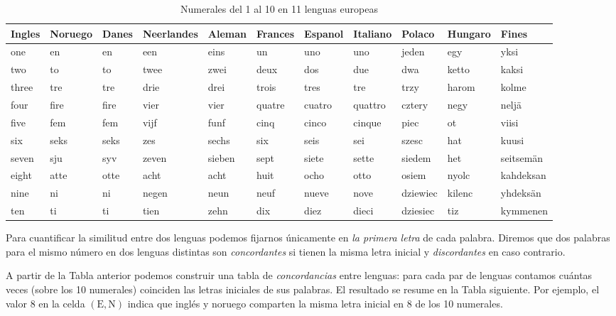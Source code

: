 \documentclass[
]{book}
\begin{document}
\begin{table}

\caption{\label{tab:ac20}Numerales del 1 al 10 en 11 lenguas europeas}
\centering
\begin{tabular}[t]{l|l|l|l|l|l|l|l|l|l|l}
\hline
Ingles & Noruego & Danes & Neerlandes & Aleman & Frances & Espanol & Italiano & Polaco & Hungaro & Fines\\
\hline
one & en & en & een & eins & un & uno & uno & jeden & egy & yksi\\
\hline
two & to & to & twee & zwei & deux & dos & due & dwa & ketto & kaksi\\
\hline
three & tre & tre & drie & drei & trois & tres & tre & trzy & harom & kolme\\
\hline
four & fire & fire & vier & vier & quatre & cuatro & quattro & cztery & negy & neljä\\
\hline
five & fem & fem & vijf & funf & cinq & cinco & cinque & piec & ot & viisi\\
\hline
six & seks & seks & zes & sechs & six & seis & sei & szesc & hat & kuusi\\
\hline
seven & sju & syv & zeven & sieben & sept & siete & sette & siedem & het & seitsemän\\
\hline
eight & atte & otte & acht & acht & huit & ocho & otto & osiem & nyolc & kahdeksan\\
\hline
nine & ni & ni & negen & neun & neuf & nueve & nove & dziewiec & kilenc & yhdeksän\\
\hline
ten & ti & ti & tien & zehn & dix & diez & dieci & dziesiec & tiz & kymmenen\\
\hline
\end{tabular}
\end{table}

Para cuantificar la similitud entre dos lenguas podemos fijarnos únicamente en \emph{la primera letra} de cada palabra.
Diremos que dos palabras para el mismo número en dos lenguas distintas son \emph{concordantes} si tienen la misma letra inicial y \emph{discordantes} en caso contrario.

A partir de la Tabla anterior podemos construir una tabla de \emph{concordancias} entre lenguas: para cada par de lenguas contamos cuántas veces (sobre los 10 numerales) coinciden las letras iniciales de sus palabras.
El resultado se resume en la Tabla siguiente. Por ejemplo, el valor 8 en la celda \((\text{E},\text{N})\) indica que inglés y noruego comparten la misma letra inicial en 8 de los 10 numerales.
\end{document}
